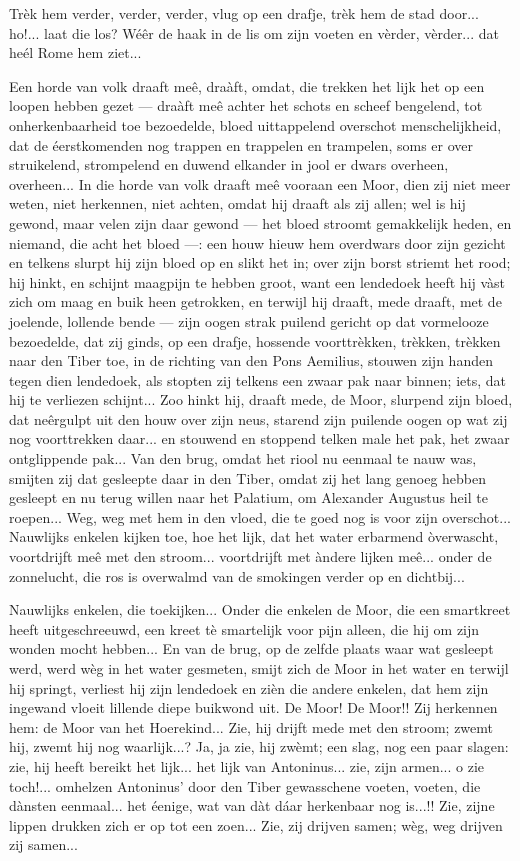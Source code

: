 \documentclass[a4paper, 12pt, oneside, dutch]{article}
\begin{document}
Trèk hem verder, verder, verder, vlug op een drafje, trèk hem de stad door... ho!... laat die los? Wéêr de haak in de lis om zijn voeten en vèrder, vèrder... dat heél Rome hem ziet...

Een horde van volk draaft meê, draàft, omdat, die trekken het lijk het op een loopen hebben gezet --- draàft meê achter het schots en scheef bengelend, tot onherkenbaarheid toe bezoedelde, bloed uittappelend overschot menschelijkheid, dat de éerstkomenden nog trappen en trappelen en trampelen, soms er over struikelend, strompelend en duwend elkander in jool er dwars overheen, overheen... In die horde van volk draaft meê vooraan een Moor, dien zij niet meer weten, niet herkennen, niet achten, omdat hij draaft als zij allen; wel is hij gewond, maar velen zijn daar gewond --- het bloed stroomt gemakkelijk heden, en niemand, die acht het bloed ---: een houw hieuw hem overdwars door zijn gezicht en telkens slurpt hij zijn bloed op en slikt het in; over zijn borst striemt het rood; hij hinkt, en schijnt maagpijn te hebben groot, want een lendedoek heeft hij vàst zich om maag en buik heen getrokken, en terwijl hij draaft, mede draaft, met de joelende, lollende bende --- zijn oogen strak puilend gericht op dat vormelooze bezoedelde, dat zij ginds, op een drafje, hossende voorttrèkken, trèkken, trèkken naar den Tiber toe, in de richting van den Pons Aemilius, stouwen zijn handen tegen dien lendedoek, als stopten zij telkens een zwaar pak naar binnen; iets, dat hij te verliezen schijnt... Zoo hinkt hij, draaft mede, de Moor, slurpend zijn bloed, dat neêrgulpt uit den houw over zijn neus, starend zijn puilende oogen op wat zij nog voorttrekken daar... en stouwend en stoppend telken male het pak, het zwaar ontglippende pak... Van den brug, omdat het riool nu eenmaal te nauw was, smijten zij dat gesleepte daar in den Tiber, omdat zij het lang genoeg hebben gesleept en nu terug willen naar het Palatium, om Alexander Augustus heil te roepen... Weg, weg met hem in den vloed, die te goed nog is voor zijn overschot... Nauwlijks enkelen kijken toe, hoe het lijk, dat het water erbarmend òverwascht, voortdrijft meê met den stroom... voortdrijft met àndere lijken meê... onder de zonnelucht, die ros is overwalmd van de smokingen verder op en dichtbij...

Nauwlijks enkelen, die toekijken... Onder die enkelen de Moor, die een smartkreet heeft uitgeschreeuwd, een kreet tè smartelijk voor pijn alleen, die hij om zijn wonden mocht hebben... En van de brug, op de zelfde plaats waar wat gesleept werd, werd wèg in het water gesmeten, smijt zich de Moor in het water en terwijl hij springt, verliest hij zijn lendedoek en zièn die andere enkelen, dat hem zijn ingewand vloeit lillende diepe buikwond uit. De Moor! De Moor!! Zij herkennen hem: de Moor van het Hoerekind... Zie, hij drijft mede met den stroom; zwemt hij, zwemt hij nog waarlijk...? Ja, ja zie, hij zwèmt; een slag, nog een paar slagen: zie, hij heeft bereikt het lijk... het lijk van Antoninus... zie, zijn armen... o zie toch!... omhelzen Antoninus' door den Tiber gewasschene voeten, voeten, die dànsten eenmaal... het éenige, wat van dàt dáar herkenbaar nog is...!! Zie, zijne lippen drukken zich er op tot een zoen... Zie, zij drijven samen; wèg, weg drijven zij samen...
\end{document}
